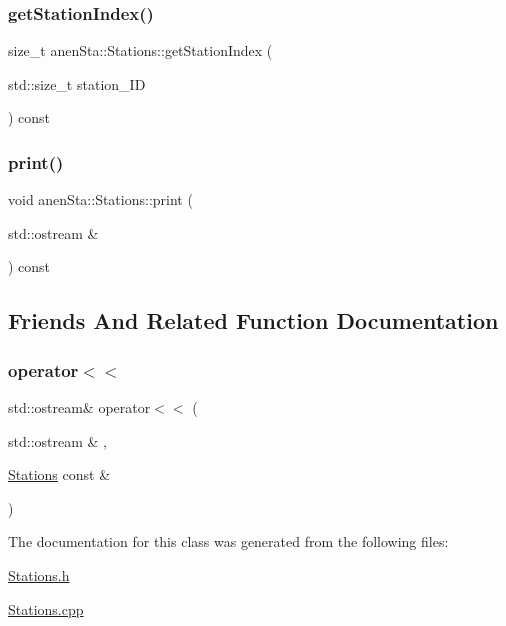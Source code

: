 \mbox{\label{classanen_sta_1_1_stations_adfe7d2db9b2c39d1a1004c240c9a82dd}} 
\subsubsection{\texorpdfstring{get\+Station\+Index()}{getStationIndex()}}
{\footnotesize\ttfamily size\+\_\+t anen\+Sta\+::\+Stations\+::get\+Station\+Index (\begin{DoxyParamCaption}\item[{std\+::size\+\_\+t}]{station\+\_\+\+ID }\end{DoxyParamCaption}) const}

\mbox{\label{classanen_sta_1_1_stations_ad7e588bc0b3f01ec564109f72b544f12}} 
\subsubsection{\texorpdfstring{print()}{print()}}
{\footnotesize\ttfamily void anen\+Sta\+::\+Stations\+::print (\begin{DoxyParamCaption}\item[{std\+::ostream \&}]{ }\end{DoxyParamCaption}) const}



\subsection{Friends And Related Function Documentation}
\mbox{\label{classanen_sta_1_1_stations_a6c2ba44849c083fa6d206d4573ea523e}} 
\subsubsection{\texorpdfstring{operator$<$$<$}{operator<<}}
{\footnotesize\ttfamily std\+::ostream\& operator$<$$<$ (\begin{DoxyParamCaption}\item[{std\+::ostream \&}]{,  }\item[{\mbox{\hyperlink{classanen_sta_1_1_stations}{Stations}} const \&}]{ }\end{DoxyParamCaption})\hspace{0.3cm}{\ttfamily [friend]}}



The documentation for this class was generated from the following files\+:\begin{DoxyCompactItemize}
\item 
\mbox{\hyperlink{_stations_8h}{Stations.\+h}}\item 
\mbox{\hyperlink{_stations_8cpp}{Stations.\+cpp}}\end{DoxyCompactItemize}
